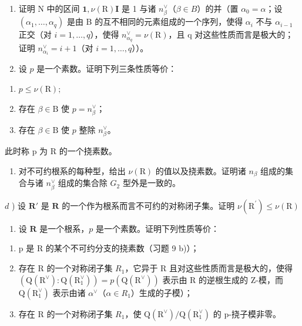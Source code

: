 \begin{enumerate}
\begin{enumerate}
\def\labelenumi{\alph{enumi})}
\item
  证明 N 中的区间 \(\mathbf{1},\nu(\mathrm{R})\mathbf{I}\) 是 1 与诸 \(n_{\beta}^{\vee}\)（\(\beta\in B\)）的并（置 \(\alpha_{0}=\alpha\)；设 \((\alpha_{1},\ldots,\alpha_{q})\) 是由 B 的互不相同的元素组成的一个序列，使得 \(\alpha_{i}\) 不与 \(\alpha_{i-1}\) 正交（对 \(i=1,\ldots,q\)），使得 \(n_{\alpha_{q}}^{\vee}=\nu(\mathrm{R})\)，且 q 对这些性质而言是极大的；证明 \(n_{\alpha_{i}}^{\vee}=i+1\)（对 \(i=1,\ldots,q\)））。
\item
  设 \(p\) 是一个素数。证明下列三条性质等价：
\end{enumerate}

\begin{enumerate}
\def\labelenumi{(\roman{enumi})}
\item
  \(p \leq \nu(\mathrm{R});\)
\item
  存在 \(\beta \in \mathrm{B}\) 使 \(p = n_{\beta}^{\vee}\)；
\item
  存在 \(\beta \in \mathrm{B}\) 使 \(p\) 整除 \(n_{\beta}^{\vee}\)。
\end{enumerate}

此时称 p 为 R 的一个挠素数。

\begin{enumerate}
\def\labelenumi{\alph{enumi})}
\setcounter{enumi}{2}
\tightlist
\item
  对不可约根系的每种型，给出 \(\nu(\mathrm{R})\) 的值以及挠素数。证明诸 \(n_{\beta}\) 组成的集合与诸 \(n_{\beta}^{\vee}\) 组成的集合除 \(G_{2}\) 型外是一致的。
\end{enumerate}

\(d\) ) 设 \(\mathbf{R}'\) 是 \(\mathbf{R}\) 的一个作为根系而言不可约的对称闭子集。证明 \(\nu (\mathrm{R}^{\prime})\leq \nu (\mathrm{R})\)

\begin{enumerate}
\def\labelenumi{\arabic{enumi})}
\setcounter{enumi}{9}
\tightlist
\item
  设 \(\mathbf{R}\) 是一个根系，\(p\) 是一个素数。证明下列性质等价：
\end{enumerate}

\begin{enumerate}
\def\labelenumi{(\roman{enumi})}
\item
  p 是 R 的某个不可约分支的挠素数（习题 9 b)）；\\
\item
  存在 R 的一个对称闭子集 \(R_{1}\)，它异于 R 且对这些性质而言是极大的，使得 \((\mathrm{Q}(\mathrm{R}^{\vee}):\mathrm{Q}(\mathrm{R}_{1}^{\vee}))=p(\mathrm{Q}(\mathrm{R}^{\vee}))\) 表示由 R 的逆根生成的 Z-模，而 \(\mathrm{Q}(\mathrm{R}_{1}^{\vee})\) 表示由诸 \(\alpha^{\vee}\)（\(\alpha\in R_{1}\)）生成的子模）；
\item
  存在 R 的一个对称闭子集 \(R_{1}\)，使 \(\mathrm{Q}(\mathrm{R}^{\vee})/\mathrm{Q}(\mathrm{R}_{1}^{\vee})\) 的 p-挠子模非零。
\end{enumerate}


\end{enumerate}
